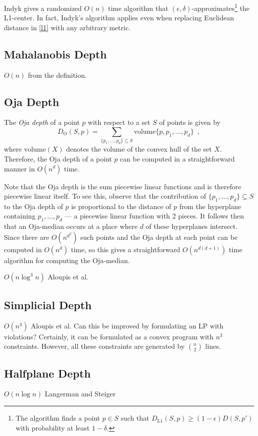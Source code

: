 \documentclass[lotsofwhite,charterfonts]{patmorin}
\newcommand{\DLO}{D_\mathrm{L1}}
\newcommand{\DO}{D_\mathrm{O}}
\begin{document}
Indyk \cite{X} gives a randomized $O(n)$ time algorithm that
$(\epsilon,\delta)$-approximates\footnote{The algorithm finds a point
$p\in S$ such that $\DLO(S,p)\ge (1-\epsilon)D(S,p')$ with probability
at least $1-\delta$.} the L1-center.  In fact, Indyk's algorithm
applies even when replacing Euclidean distance in \eqref{l1} with any
arbitrary metric.

\subsection{Mahalanobis Depth}

$O(n)$ from the definition.

\subsection{Oja Depth} 

The \emph{Oja depth} of a point $p$ with respect to a set $S$ of
points is given by 
\[
      \DO(S,p) = \sum_{\{p_1,\ldots, p_{d}\}\subseteq S}
	\mathrm{volume}\{p,p_1,\ldots,p_d\} \enspace ,
\]
where $\mathrm{volume}(X)$ denotes the volume of the convex hull of
the set $X$.  Therefore, the Oja depth of a point $p$ can be computed
in a straightforward manner in $O(n^d)$ time.

Note that the Oja depth is the sum piecewise linear functions and is
therefore piecewise linear itself.  To see this, observe that the
contribution of $\{p_1,\ldots,p_d\}\subseteq S$ to the Oja depth of
$p$ is proportional to the distance of $p$ from the hyperplane
containing $p_1,\ldots,p_d$ --- a piecewise linear function with 2
pieces. It follows then that an Oja-median occurs at a place where $d$
of these hyperplanes intersect.  Since there are $O(n^{d^2})$ such
points and the Oja depth at each point can be computed in $O(n^d)$
time, so this gives a straightforward $O(n^{d(d+1)})$ time algorithm
for computing the Oja-median. 



$O(n\log^3 n)$ Aloupis et al.

\subsection{Simplicial Depth}
$O(n^4)$ Aloupis et al.  Can this be improved by
formulating an LP with violations?   Certainly, it can be formulated as a
convex program with $n^3$ constraints.  However, all these constraints are generated by $n\choose 2$ lines.

\subsection{Halfplane Depth}
$O(n\log n)$ Langerman and Steiger
\end{document}
